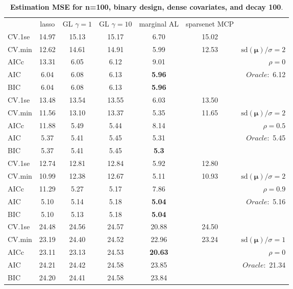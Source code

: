 \clearpage
\begin{table}\vspace{-.5cm}
\caption[l]{ { \bf Estimation MSE for n=100, binary design, 
dense covariates, and  decay  100}.}
\vspace{-.5cm}
\footnotesize{}
\begin{center}
\begin{tabular}{l*{5}{c}|r}
& lasso & GL $\gamma=1$ & GL $\gamma=10$ & marginal AL & sparsenet MCP  & \\
 \cline{1-7}
CV.1se & 14.97 & 15.13 & 15.17 & 6.70 & 15.02 & \\
CV.min & 12.62 & 14.61 & 14.91 & 5.99 & 12.53 &  $\mathrm{sd}(\mathbf{\mu})/\sigma=2$ \\
AICc & 13.31 & 6.05 & 6.12 & 9.01 & & $\rho=0$ \\
AIC & 6.04 & 6.08 & 6.13 & {\bf 5.96} & &  \multirow{2}{*}{$Oracle: $ 6.12} \\
BIC & 6.04 & 6.08 & 6.13 & {\bf 5.96} & &  \\
 \hline 
CV.1se & 13.48 & 13.54 & 13.55 & 6.03 & 13.50 & \\
CV.min & 11.56 & 13.10 & 13.37 & 5.35 & 11.65 &  $\mathrm{sd}(\mathbf{\mu})/\sigma=2$ \\
AICc & 11.88 & 5.49 & 5.44 & 8.14 & & $\rho=0.5$ \\
AIC & 5.37 & 5.41 & 5.45 & 5.31 & &  \multirow{2}{*}{$Oracle: $ 5.45} \\
BIC & 5.37 & 5.41 & 5.45 & {\bf 5.3} & &  \\
 \hline 
CV.1se & 12.74 & 12.81 & 12.84 & 5.92 & 12.80 & \\
CV.min & 10.99 & 12.38 & 12.67 & 5.11 & 10.93 &  $\mathrm{sd}(\mathbf{\mu})/\sigma=2$ \\
AICc & 11.29 & 5.27 & 5.17 & 7.86 & & $\rho=0.9$ \\
AIC & 5.10 & 5.14 & 5.18 & {\bf 5.04} & &  \multirow{2}{*}{$Oracle: $ 5.16} \\
BIC & 5.10 & 5.13 & 5.18 & {\bf 5.04} & &  \\
 \hline 
CV.1se & 24.48 & 24.56 & 24.57 & 20.88 & 24.50 & \\
CV.min & 23.19 & 24.40 & 24.52 & 22.96 & 23.24 &  $\mathrm{sd}(\mathbf{\mu})/\sigma=1$ \\
AICc & 23.11 & 23.13 & 24.53 & {\bf 20.63} & & $\rho=0$ \\
AIC & 24.21 & 24.42 & 24.58 & 23.85 & &  \multirow{2}{*}{$Oracle: $ 21.34} \\
BIC & 24.20 & 24.41 & 24.58 & 23.84 & &  \\

\end{tabular}
\end{center}
\end{table}
